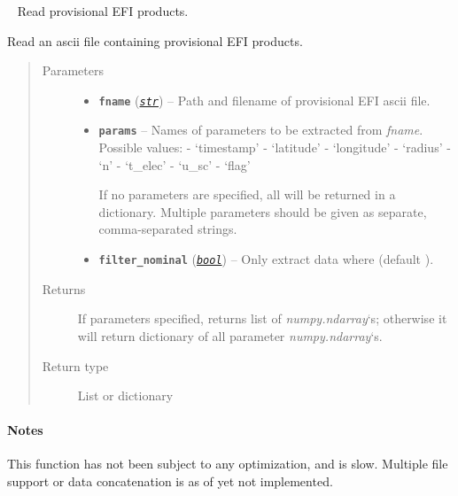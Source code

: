 \documentclass[letterpaper,10pt,english]{sphinxhowto}
\begin{document}

\begin{fulllineitems}
\label{swtools_doc:swtools.read_EFI_prov_txt}~\label{swtools_doc:read-efi-prov-txt}
Read provisional EFI products.

Read an ascii file containing provisional EFI products.
\begin{quote}\begin{description}
\item[{Parameters}] \leavevmode\begin{itemize}
\item {} 
\textbf{\texttt{fname}} (\href{https://docs.python.org/library/functions.html\#str}{\emph{\texttt{str}}}) -- Path and filename of provisional EFI ascii file.

\item {} 
\textbf{\texttt{params}} -- 
Names of parameters to be extracted from \emph{fname}. Possible values:
- `timestamp'
- `latitude'
- `longitude'
- `radius'
- `n'
- `t\_elec'
- `u\_sc'
- `flag'

If no parameters are specified, all will be returned in a
dictionary. Multiple parameters should be given as separate,
comma-separated strings.


\item {} 
\textbf{\texttt{filter\_nominal}} (\href{https://docs.python.org/library/functions.html\#bool}{\emph{\texttt{bool}}}) -- Only extract data where  (default ).

\end{itemize}

\item[{Returns}] \leavevmode
If parameters specified, returns list of \emph{numpy.ndarray}`s; otherwise
it will return dictionary of all parameter \emph{numpy.ndarray}`s.

\item[{Return type}] \leavevmode
List or dictionary

\end{description}\end{quote}
\paragraph{Notes}

This function has not been subject to any optimization, and is slow.
Multiple file support or data concatenation is as of yet not
implemented.

\end{fulllineitems}
\end{document}
